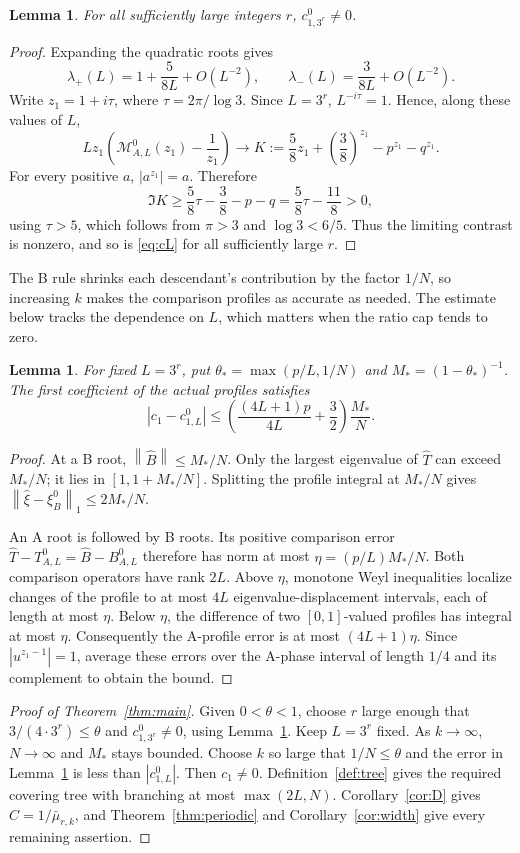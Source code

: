 \documentclass[11pt]{article}
\newtheorem{lemma}[theorem]{Lemma}
\theoremstyle{definition}
\theoremstyle{remark}
\newcommand{\norm}[1]{\left\lVert #1\right\rVert}
\begin{document}
\begin{lemma}\label{lem:nonzero-small}
For all sufficiently large integers $r$, $c^0_{1,3^r}\ne0$.
\end{lemma}
\begin{proof}
Expanding the quadratic roots gives
\[
 \lambda_+(L)=1+\frac5{8L}+O(L^{-2}),\qquad
 \lambda_-(L)=\frac3{8L}+O(L^{-2}).
\]
Write $z_1=1+i\tau$, where $\tau=2\pi/\log3$. Since $L=3^r$,
$L^{-i\tau}=1$. Hence, along these values of $L$,
\[
 Lz_1\left(\mathcal M^0_{A,L}(z_1)-\frac1{z_1}\right)
 \longrightarrow K:=\frac58z_1+\left(\frac38\right)^{z_1}
 -p^{z_1}-q^{z_1}.
\]
For every positive $a$, $|a^{z_1}|=a$. Therefore
\[
 \Im K\ge\frac58\tau-\frac38-p-q
 =\frac58\tau-\frac{11}8>0,
\]
using $\tau>5$, which follows from $\pi>3$ and $\log3<6/5$.
Thus the limiting contrast is nonzero, and so is \eqref{eq:cL} for
all sufficiently large $r$.
\end{proof}

The B rule shrinks each descendant's contribution by the factor $1/N$,
so increasing $k$ makes the comparison profiles as accurate as needed.
The estimate below tracks the dependence on $L$, which matters when the
ratio cap tends to zero.
\begin{lemma}\label{lem:general-error}
For fixed $L=3^r$, put
$\theta_* =\max(p/L,1/N)$ and $M_*=(1-\theta_*)^{-1}$.
The first coefficient of the actual profiles satisfies
\[
 |c_1-c^0_{1,L}|\le
 \left(\frac{(4L+1)p}{4L}+\frac32\right)\frac{M_*}{N}.
\]
\end{lemma}
\begin{proof}
At a B root, $\norm{\widehat B}\le M_*/N$. Only the largest eigenvalue
of $\widehat T$ can exceed $M_*/N$; it lies in $[1,1+M_*/N]$.
Splitting the profile integral at $M_*/N$ gives
$\norm{\widehat\xi-\xi_B^0}_1\le2M_*/N$.

An A root is followed by B roots. Its positive comparison error
$\widehat T-T^0_{A,L}=\widehat B-B^0_{A,L}$ therefore has norm at most
$\eta=(p/L)M_*/N$. Both comparison operators have rank $2L$. Above
$\eta$, monotone Weyl inequalities localize changes of the profile to
at most $4L$ eigenvalue-displacement intervals, each of length at most
$\eta$. Below $\eta$, the difference of two $[0,1]$-valued profiles has
integral at most $\eta$. Consequently the A-profile error is at most
$(4L+1)\eta$. Since $|u^{z_1-1}|=1$, average these errors over the
A-phase interval of length $1/4$ and its complement to obtain the bound.
\end{proof}

\begin{proof}[Proof of Theorem~\ref{thm:main}]
Given $0<\theta<1$, choose $r$ large enough that
$3/(4\cdot3^r)\le\theta$ and $c^0_{1,3^r}\ne0$, using
Lemma~\ref{lem:nonzero-small}. Keep $L=3^r$ fixed. As $k\to\infty$,
$N\to\infty$ and $M_*$ stays bounded. Choose $k$ so large that
$1/N\le\theta$ and the error in Lemma~\ref{lem:general-error} is less
than $|c^0_{1,L}|$. Then $c_1\ne0$. Definition~\ref{def:tree} gives
the required covering tree with branching at most $\max(2L,N)$.
Corollary~\ref{cor:D} gives $C=1/\bar\mu_{r,k}$, and
Theorem~\ref{thm:periodic} and Corollary~\ref{cor:width} give every
remaining assertion.
\end{proof}
\end{document}
